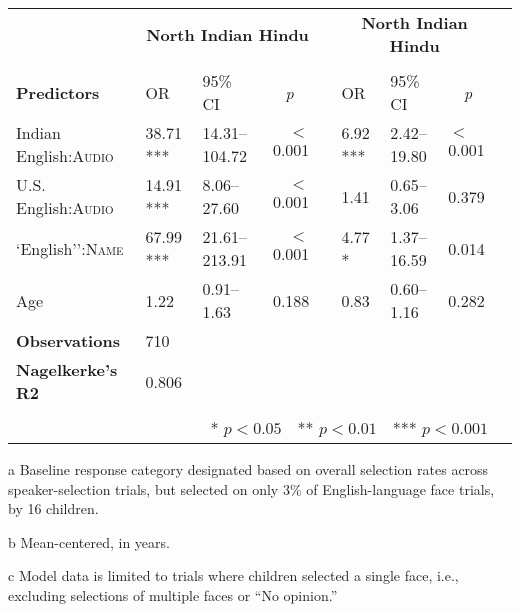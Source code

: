 \begin{table}[ht]
\begin{threeparttable}
\begin{tabular}{lllrllllr}
& \multicolumn{3}{c}{\textbf{North Indian Hindu}\tnote{a}} & & \multicolumn{3}{c}{\textbf{North Indian Hindu}\tnote{a}} \\
\cline{2-4} \cline{6-8} \\[-.75em]
\textbf{Predictors} & OR & 95\% CI & \multicolumn{1}{c}{\textit{p}} & & OR & 95\% CI & \multicolumn{1}{c}{\textit{p}} \\ 
\midrule
 Indian English:\textsc{Audio} & 38.71 *** & 14.31--104.72 & $<$0.001 &  & 6.92 *** & 2.42--19.80 & $<$0.001 \\ 
 U.S. English:\textsc{Audio} & 14.91 *** & 8.06--27.60 & $<$0.001 &  & 1.41 & 0.65--3.06 & 0.379 \\ 
  `English'':\textsc{Name} & 67.99 *** & 21.61--213.91 & $<$0.001 &  & 4.77 * & 1.37--16.59 & 0.014 \\ 
 Age\tnote{b} & 1.22 & 0.91--1.63 & 0.188 &  & 0.83 & 0.60--1.16 & 0.282 \\ 
\midrule
\textbf{Observations}\tnote{c} & 710  &  &  &  &  &  &  \\
\textbf{Nagelkerke's R2} & 0.806  &  &  &  &  &  &  \\
\bottomrule\\[-.75em]
\multicolumn{8}{r}{* $p<0.05$~~** $p<0.01$~~*** $p<0.001$}\\
\end{tabular}
\begin{tablenotes}[flushleft]
    \item[a] Baseline response category designated based on overall selection rates across speaker-selection trials, but selected on only 3\% of English-language face trials, by 16 children. %
    \item[b] Mean-centered, in years.
    \item[c] Model data is limited to trials where children selected a single face, i.e., excluding selections of multiple faces or ``No opinion.'' 
\end{tablenotes}
\end{threeparttable}
\end{table}
